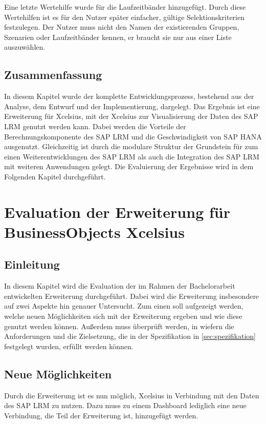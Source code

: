 \begin{onehalfspacing}
Eine letzte Wertehilfe wurde für die Laufzeitbänder hinzugefügt. Durch diese Wertehilfen ist es für den Nutzer später einfacher, gültige Selektionskriterien festzulegen. Der Nutzer muss nicht den Namen der existierenden Gruppen, Szenarien oder Laufzeitbänder kennen, er braucht sie nur aus einer Liste auszuwählen.

\section{Zusammenfassung}
In diesem Kapitel wurde der komplette Entwicklungsprozess, bestehend aus der Analyse, dem Entwurf und der Implementierung, dargelegt. Das Ergebnis ist eine Erweiterung für Xcelsius, mit der Xcelsius zur Visualisierung der Daten des SAP LRM genutzt werden kann. Dabei werden die Vorteile der Berechnungskomponente des SAP LRM und die Geschwindigkeit von SAP HANA ausgenutzt. Gleichzeitig ist durch die modulare Struktur der Grundstein für zum einen Weiterentwicklungen des SAP LRM als auch die Integration des SAP LRM mit weiteren Anwendungen gelegt. Die Evaluierung der Ergebnisse wird in dem Folgenden Kapitel durchgeführt.

\chapter{Evaluation der Erweiterung für BusinessObjects Xcelsius}

\section{Einleitung}
In diesem Kapitel wird die Evaluation der im Rahmen der Bachelorarbeit entwickelten Erweiterung durchgeführt. Dabei wird die Erweiterung insbesondere auf zwei Aspekte hin genauer Untersucht. Zum einen soll aufgezeigt werden, welche neuen Möglichkeiten sich mit der Erweiterung ergeben und wie diese genutzt werden können. Außerdem muss überprüft werden, in wiefern die Anforderungen und die Zielsetzung, die in der Spezifikation in \vref{sec:spezifikation} festgelegt wurden, erfüllt werden können.

\section{Neue Möglichkeiten}
Durch die Erweiterung ist es nun möglich, \gls{Xcelsius} in Verbindung mit den Daten des SAP LRM zu nutzen. Dazu muss zu einem Dashboard lediglich eine neue Verbindung, die Teil der Erweiterung ist, hinzugefügt werden.


\end{onehalfspacing}
